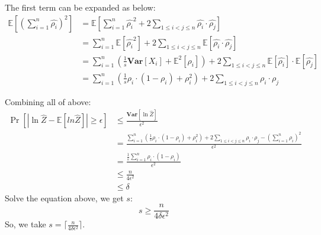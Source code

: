 \documentclass[a4paper, 12pt, titlepage]{article}
\begin{document}
The first term can be expanded as below:
\begin{equation}
    \begin{aligned}
        \mathbb E \left[ \left( \sum_{i = 1}^{n} \hat{\rho_{i}} \right)^2 \right] &= \mathbb E \left[ \sum_{i = 1}^{n} \hat{\rho_{i}}^2 + 2 \sum_{1 \leq i < j \leq n} \hat{\rho_{i}} \cdot \hat{\rho_{j}}\right] \\
                                                                                  &= \sum_{i = 1}^{n} \mathbb E \left[ \hat{\rho_{i}}^2 \right] + 2 \sum_{1 \leq i < j \leq n} \mathbb E \left[ \hat{\rho_{i}} \cdot \hat{\rho_{j}} \right] \\
                                                                                  &= \sum_{i = 1}^{n} \left( \frac{1}{s} \mathbf{Var} \left[ X_{i} \right] + \mathbb{E}^2 \left[ \rho_{i} \right] \right) + 2 \sum_{1 \leq i < j \leq n} \mathbb E \left[ \hat{\rho_{i}} \right] \cdot \mathbb E\left[ \hat{\rho_{j}} \right] \\
                                                                                  &= \sum_{i = 1}^{n} \left( \frac{1}{s} \rho_{i} \cdot \left( 1 - \rho_{i} \right) + \rho_{i}^2 \right) + 2 \sum_{1 \leq i < j \leq n} \rho_{i} \cdot \rho_{j}
    \end{aligned}
\end{equation}

Combining all of above:
\begin{equation}
    \begin{aligned}
        \Pr \left[ |\ln{\hat{Z}} - \mathbb E \left[ ln{\hat{Z}} \right] | \geq \epsilon \right] &\leq \frac{\mathbf{Var} \left[ \ln{\hat{Z}}\right] }{\epsilon^{2}} \\
                                                                                                &= \frac{\sum_{i = 1}^{n} \left( \frac{1}{s} \rho_{i} \cdot \left( 1 - \rho_{i} \right) + \rho_{i}^2 \right) + 2 \sum_{1 \leq i < j \leq n} \rho_{i} \cdot \rho_{j} - \left( \sum_{i = 1}^{n} \rho_{i} \right)^2 }{\epsilon^2} \\
                                                                                                &= \frac{\frac{1}{s} \sum_{i = 1}^{n} \rho_{i} \cdot \left( 1 - \rho_{i} \right)}{\epsilon^2} \\
                                                                                                &\leq \frac{n}{4 \epsilon^2} \\
                                                                                                &\leq \delta
    \end{aligned}
\end{equation}
Solve the equation above, we get $s$:
\[
    s \geq \frac{n}{4 \delta \epsilon^2}
\]
So, we take $s = \lceil \frac{n}{4 \delta \epsilon^2} \rceil$.
\end{document}
